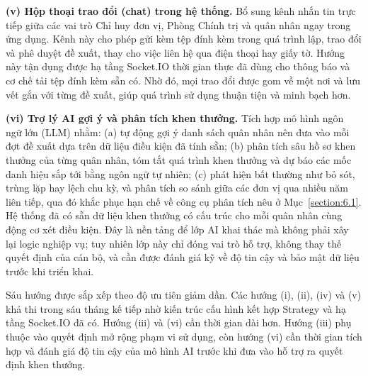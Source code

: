 \documentclass[../DoAn.tex]{subfiles}
\begin{document}
\textbf{(v) Hộp thoại trao đổi (chat) trong hệ thống.} Bổ sung kênh nhắn tin trực tiếp giữa các vai trò Chỉ huy đơn vị, Phòng Chính trị và quân nhân ngay trong ứng dụng. Kênh này cho phép gửi kèm tệp đính kèm trong quá trình lập, trao đổi và phê duyệt đề xuất, thay cho việc liên hệ qua điện thoại hay giấy tờ. Hướng này tận dụng được hạ tầng Socket.IO thời gian thực đã dùng cho thông báo và cơ chế tải tệp đính kèm sẵn có. Nhờ đó, mọi trao đổi được gom về một nơi và lưu vết gắn với từng đề xuất, giúp quá trình sử dụng thuận tiện và minh bạch hơn.

\textbf{(vi) Trợ lý AI gợi ý và phân tích khen thưởng.} Tích hợp mô hình ngôn ngữ lớn (LLM) nhằm: (a) tự động gợi ý danh sách quân nhân nên đưa vào mỗi đợt đề xuất dựa trên dữ liệu điều kiện đã tính sẵn; (b) phân tích sâu hồ sơ khen thưởng của từng quân nhân, tóm tắt quá trình khen thưởng và dự báo các mốc danh hiệu sắp tới bằng ngôn ngữ tự nhiên; (c) phát hiện bất thường như bỏ sót, trùng lặp hay lệch chu kỳ, và phân tích so sánh giữa các đơn vị qua nhiều năm liên tiếp, qua đó khắc phục hạn chế về công cụ phân tích nêu ở Mục~\ref{section:6.1}. Hệ thống đã có sẵn dữ liệu khen thưởng có cấu trúc cho mỗi quân nhân cùng động cơ xét điều kiện. Đây là nền tảng để lớp AI khai thác mà không phải xây lại logic nghiệp vụ; tuy nhiên lớp này chỉ đóng vai trò hỗ trợ, không thay thế quyết định của cán bộ, và cần được đánh giá kỹ về độ tin cậy và bảo mật dữ liệu trước khi triển khai.

Sáu hướng được sắp xếp theo độ ưu tiên giảm dần. Các hướng (i), (ii), (iv) và (v) khả thi trong sáu tháng kế tiếp nhờ kiến trúc cấu hình kết hợp Strategy và hạ tầng Socket.IO đã có. Hướng (iii) và (vi) cần thời gian dài hơn. Hướng (iii) phụ thuộc vào quyết định mở rộng phạm vi sử dụng, còn hướng (vi) cần thời gian tích hợp và đánh giá độ tin cậy của mô hình AI trước khi đưa vào hỗ trợ ra quyết định khen thưởng.
\end{document}

